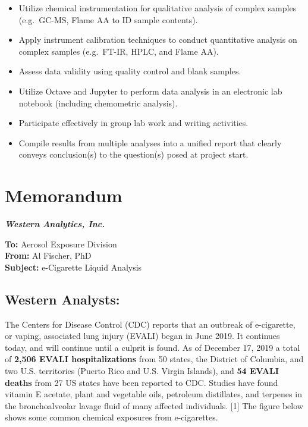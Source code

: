 \documentclass[]{tufte-book}
\providecommand{\tightlist}{%
  \setlength{\itemsep}{0pt}\setlength{\parskip}{0pt}}
\begin{document}
\begin{itemize}
\tightlist
\item
  Utilize chemical instrumentation for qualitative analysis of complex samples (e.g.~GC-MS, Flame AA to ID sample contents).\\
\item
  Apply instrument calibration techniques to conduct quantitative analysis on complex samples (e.g.~FT-IR, HPLC, and Flame AA).\\
\item
  Assess data validity using quality control and blank samples.\\
\item
  Utilize Octave and Jupyter to perform data analysis in an electronic lab notebook (including chemometric analysis).\\
\item
  Participate effectively in group lab work and writing activities.\\
\item
  Compile results from multiple analyses into a unified report that clearly conveys conclusion(s) to the question(s) posed at project start.
\end{itemize}

\newpage

\hypertarget{memorandum}{%
\section*{Memorandum}\label{memorandum}}

\noindent
\textbf{\emph{Western Analytics, Inc.}}

\noindent  
\textbf{To:} Aerosol Exposure Division\\
\noindent  
\textbf{From:} Al Fischer, PhD\\
\noindent  
\textbf{Subject:} e-Cigarette Liquid Analysis

\hypertarget{western-analysts}{%
\subsection*{Western Analysts:}\label{western-analysts}}

The Centers for Disease Control (CDC) reports that an outbreak of e-cigarette, or vaping, associated lung injury (EVALI) began in June 2019. It continues today, and will continue until a culprit is found. As of December 17, 2019 a total of \textbf{2,506 EVALI hospitalizations} from 50 states, the District of Columbia, and two U.S. territories (Puerto Rico and U.S. Virgin Islands), and \textbf{54 EVALI deaths} from 27 US states have been reported to CDC. Studies have found vitamin E acetate, plant and vegetable oils, petroleum distillates, and terpenes in the bronchoalveolar lavage fluid of many affected individuals. {[}1{]} The figure below shows some common chemical exposures from e-cigarettes.
\end{document}
